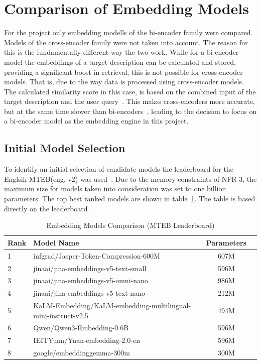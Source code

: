 \section{Comparison of Embedding Models}\label{sec:comp_emb_models}

For the project only embedding modells of the bi-encoder family were compared. Models of the cross-encoder family were not taken into account. The reason for this is the fundamentally different way the two work. While for a bi-encoder model the embeddings of a target description can be calculated and stored, providing a significant boost in retrieval, this is not possible for cross-encoder models. That is, due to the way data is processed using cross-encoder models. The calculated similarity score in this case, is based on the combined input of the target description and the user query~\cite{qin2026ricci}. This makes cross-encoders more accurate, but at the same time slower than bi-encoders~\cite{weaviate2023crossencoders}, leading to the decision to focus on a bi-encoder model as the embedding engine in this project.

\subsection{Initial Model Selection}

To identify an initial selection of candidate models the leaderboard for the Englsih MTEB(eng, v2) was used~\cite{mteb_leaderboard}. Due to the memory constraints of NFR-3, the maximum size for models taken into consideration was set to one billion parameters. The top best ranked models are shown in table~\ref{tab:best_models}. The table is based directly on the leaderboard~\cite{mteb_leaderboard}.

\begin{table}[htbp]
\centering
\caption{Embedding Models Comparison (MTEB Leaderboard)}
\label{tab:best_models}
\begin{tabularx}{\textwidth}{lXcr}
\toprule
\textbf{Rank} & \textbf{Model Name} & \textbf{Parameters} \\
\midrule
1 & infgrad/Jasper-Token-Compression-600M & 607M \\
2 & jinaai/jina-embeddings-v5-text-small & 596M \\
3 & jinaai/jina-embeddings-v5-omni-nano & 986M \\
4 & jinaai/jina-embeddings-v5-text-nano & 212M \\
5 & KaLM-Embedding/KaLM-embedding-multilingual-mini-instruct-v2.5 & 494M \\
6 & Qwen/Qwen3-Embedding-0.6B & 596M \\
7 & IEITYuan/Yuan-embedding-2.0-en & 596M \\
8 & google/embeddinggemma-300m & 300M \\
\bottomrule
\end{tabularx}
\end{table}

